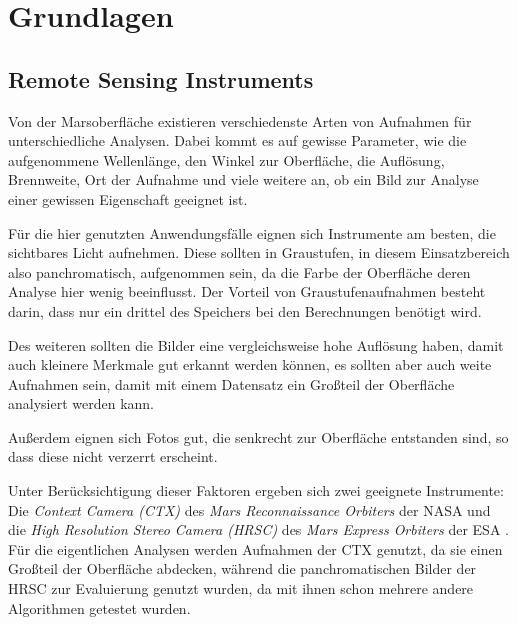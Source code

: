 \chapter{Grundlagen}
\label{chap:grundlagen}


\section{Remote Sensing Instruments} %
\label{sec:mars_images}

Von der Marsoberfläche existieren verschiedenste Arten von Aufnahmen für unterschiedliche Analysen. Dabei kommt es auf gewisse Parameter, wie \zB die aufgenommene Wellenlänge, den Winkel zur Oberfläche, die Auflösung, Brennweite, Ort der Aufnahme und viele weitere an, ob ein Bild zur Analyse einer gewissen Eigenschaft geeignet ist.

Für die hier genutzten Anwendungsfälle eignen sich Instrumente am besten, die sichtbares Licht aufnehmen. Diese sollten in Graustufen, in diesem Einsatzbereich also panchromatisch, aufgenommen sein, da die Farbe der Oberfläche deren Analyse hier wenig beeinflusst. Der Vorteil von Graustufenaufnahmen besteht darin, dass nur ein drittel des Speichers bei den Berechnungen benötigt wird.

Des weiteren sollten die Bilder eine vergleichsweise hohe Auflösung haben, damit auch kleinere Merkmale gut erkannt werden können, es sollten aber auch weite Aufnahmen sein, damit mit einem Datensatz ein Großteil der Oberfläche analysiert werden kann.

Außerdem eignen sich Fotos gut, die senkrecht zur Oberfläche entstanden sind, so dass diese nicht verzerrt erscheint.

Unter Berücksichtigung dieser Faktoren ergeben sich \ua zwei geeignete Instrumente:
Die \textit{Context Camera (CTX)} des \textit{Mars Reconnaissance Orbiters} der NASA \cite{malin_07} und die \textit{High Resolution Stereo Camera (HRSC)} des \textit{Mars Express Orbiters} der ESA \cite{hrsc}. Für die eigentlichen Analysen werden Aufnahmen der CTX genutzt, da sie einen Großteil der Oberfläche abdecken, während die panchromatischen Bilder der HRSC zur Evaluierung genutzt wurden, da mit ihnen schon mehrere andere Algorithmen getestet wurden.

